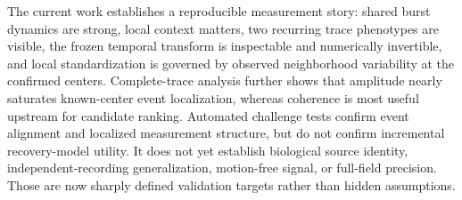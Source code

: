 The current work establishes a reproducible measurement story: shared burst
dynamics are strong, local context matters, two recurring trace phenotypes are
visible, the frozen temporal transform is inspectable and numerically
invertible, and local standardization is governed by observed neighborhood
variability at the confirmed centers. Complete-trace analysis further shows
that amplitude nearly saturates known-center event localization, whereas
coherence is most useful upstream for candidate ranking. Automated challenge
tests confirm event alignment and localized measurement structure, but do not
confirm incremental recovery-model utility. It does not yet establish biological
source identity, independent-recording generalization, motion-free signal, or
full-field precision. Those are now sharply defined validation targets rather
than hidden assumptions.
